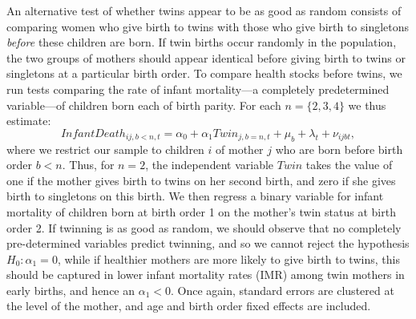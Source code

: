 \documentclass[subeqn]{article}
\begin{document}
\begin{spacing}{1.4}
An alternative test of whether twins appear to be as good as random consists of
comparing women who give birth to twins with those who give birth to singletons
\emph{before} these children are born.  If twin births occur randomly in the
population, the two groups of mothers should appear identical before giving
birth to twins or singletons at a particular birth order. To compare health
stocks before twins, we run tests comparing the rate of infant mortality---a
completely predetermined variable---of children born each of birth parity. For
each $n=\{2,3,4\}$ we thus estimate:
\begin{equation}
  \label{TWINeqn:twinIMR}
  InfantDeath_{ij,b<n,t}=\alpha_0 + \alpha_1 Twin_{j,b=n,t} + \mu_b + \lambda_t
                        +\nu_{ijbt},
\end{equation}
where we restrict our sample to children $i$ of mother $j$ who are born before
birth order $b<n$.  Thus, for $n=2$, the independent variable $Twin$ takes the
value of one if the mother gives birth to twins on her second birth, and zero if
she gives birth to singletons on this birth.  We then regress a binary variable
for infant mortality of children born at birth order 1 on the mother's twin
status at birth order 2. If twinning is as good as random, we should observe
that no completely pre-determined variables predict twinning, and so we cannot
reject the hypothesis $H_0: \alpha_1=0$, while if healthier mothers are more
likely to give birth to twins, this should be captured in lower infant mortality
rates (IMR) among twin mothers in early births, and hence an $\alpha_1<0$. Once
again, standard errors are clustered at the level of the mother, and age and
birth order fixed effects are included.



\end{spacing}
\end{document}
